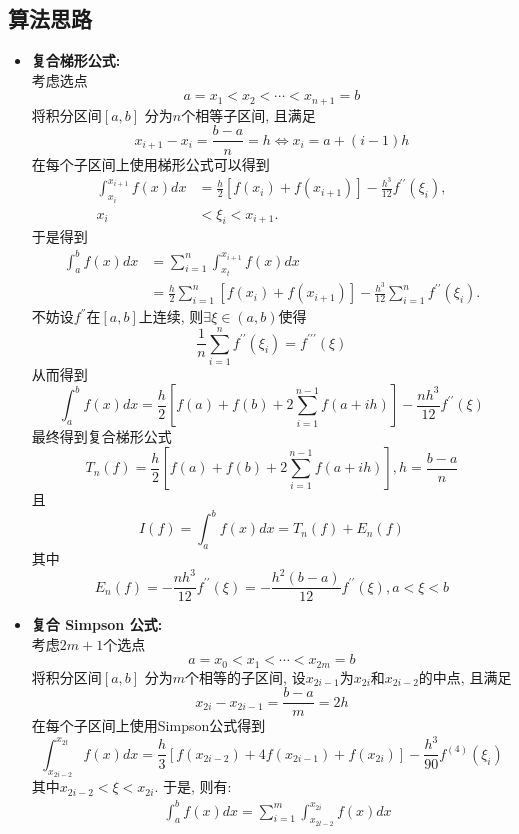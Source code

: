 \documentclass[UTF8,ctexart,a4paper,11pt,openany]{article}
\theoremstyle{definition}
\begin{document}
    \subsection{算法思路}
        \begin{itemize}
            \item \textbf{复合梯形公式: } \\ 考虑选点$$a=x_1<x_2<\cdots<x_{n+1}=b$$ 将积分区间$[a,b]$ 分为$n$个相等子区间, 且满足 $$x_{i+1}-x_i=\frac{b-a}{n}=h \Leftrightarrow x_i=a+(i-1)h$$ 在每个子区间上使用梯形公式可以得到$$\begin{aligned} \int_{x_{i}}^{x_{i+1}} f(x) d x & =\frac{h}{2}\left[f\left(x_{i}\right)+f\left(x_{i+1}\right)\right]-\frac{h^{3}}{12} f^{\prime \prime}\left(\xi_{i}\right), \\ x_{i} & <\xi_{i}<x_{i+1} .\end{aligned}$$于是得到$$\begin{aligned} \int_{a}^{b} f(x) d x & =\sum_{i=1}^{n} \int_{x_{t}}^{x_{i+1}} f(x) d x \\ & =\frac{h}{2} \sum_{i=1}^{n}\left[f\left(x_{i}\right)+f\left(x_{i+1}\right)\right]-\frac{h^{3}}{12} \sum_{i=1}^{n} f^{\prime \prime}\left(\xi_{i}\right) .\end{aligned}$$不妨设$f^{''}$在$[a,b]$上连续, 则$\exists \xi \in (a,b)$使得$$\frac{1}{n} \sum_{i=1}^{n} f^{\prime \prime}\left(\xi_{i}\right)=f^{\prime \prime \prime}(\xi)$$从而得到$$\int_{a}^{b} f(x) d x=\frac{h}{2}\left[f(a)+f(b)+2 \sum_{i=1}^{n-1} f(a+i h)\right]-\frac{n h^{3}}{12} f^{\prime \prime}(\xi)$$最终得到复合梯形公式$$T_{n}(f)=\frac{h}{2}\left[f(a)+f(b)+2 \sum_{i=1}^{n-1} f(a+i h)\right], h=\frac{b-a}{n}$$且$$I(f)=\int_{a}^{b} f(x) d x=T_{n}(f)+E_{n}(f)$$其中$$E_{n}(f)=-\frac{n h^{3}}{12} f^{\prime \prime}(\xi)=-\frac{h^{2}(b-a)}{12} f^{\prime \prime}(\xi), a<\xi<b$$
            \item \textbf{复合 Simpson 公式: } \\ 考虑$2m+1$个选点$$a=x_0<x_1<\cdots<x_{2m}=b$$ 将积分区间$[a,b]$ 分为$m$个相等的子区间, 设$x_{2i-1}$为$x_{2i}$和$x_{2i-2}$的中点, 且满足 $$x_{2i}-x_{2i-1}=\frac{b-a}{m}=2h$$ 在每个子区间上使用Simpson公式得到$$\int_{x_{2 i-2}}^{x_{2 t}} f(x) d x=\frac{h}{3}\left[f\left(x_{2 i-2}\right)+4 f\left(x_{2 i-1}\right)+f\left(x_{2 i}\right)\right]-\frac{h^{3}}{90} f^{(4)}\left(\xi_{i}\right)$$其中$x_{2i-2}<\xi<x_{2i}$. 于是, 则有: $$\begin{aligned}
                & \int_{a}^{b} f(x) d x=\sum_{i=1}^{m} \int_{x_{2 l-2}}^{x_{2 i}} f(x) d x \\

\end{aligned}$$
\end{itemize}
\end{document}
